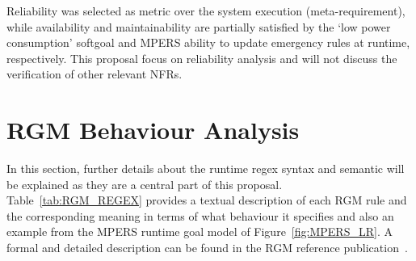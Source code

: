 Reliability was selected as metric over the system execution (meta-requirement), while availability and maintainability are partially satisfied by the `low power consumption' softgoal and MPERS ability to update emergency rules at runtime, respectively. This proposal focus on reliability analysis and will not discuss the verification of other relevant NFRs.



\section{RGM Behaviour Analysis}\label{sec:behaviour_specification}

In this section, further details about the runtime regex syntax and semantic will be explained as they are a central part of this proposal. Table~\ref{tab:RGM_REGEX} provides a textual description of each RGM rule and the corresponding meaning in terms of what behaviour it specifies and also an example from the MPERS runtime goal model of Figure~\ref{fig:MPERS_LR}. A formal and detailed description can be found in the RGM reference publication~\cite{Dalpiaz:2013}.

